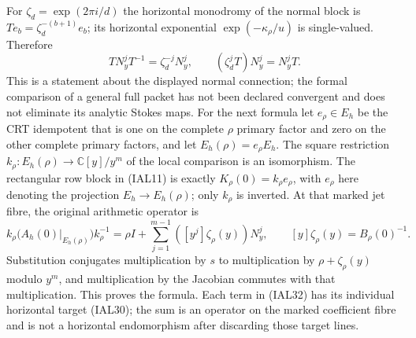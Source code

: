 \documentclass[11pt,a4paper]{article}
\theoremstyle{definition}
\begin{document}
For $\zeta_d=\exp(2\pi i/d)$ the horizontal monodromy of the normal
block is $T e_b=\zeta_d^{-(b+1)}e_b$; its horizontal exponential
$\exp(-\kappa_\rho/u)$ is single-valued.  Therefore
\begin{equation}
 TN_y^jT^{-1}=\zeta_d^{-j}N_y^j,\qquad
 (\zeta_d^jT)N_y^j=N_y^jT.                           \tag{IAL31}
\end{equation}
This is a statement about the displayed normal connection; the
formal comparison of a general full packet has not been declared
convergent and does not eliminate its analytic Stokes maps.
For the next formula let $e_\rho\in E_h$ be the CRT idempotent that
is one on the complete $\rho$ primary factor and zero on the other
complete primary factors, and let $E_h(\rho)=e_\rho E_h$.  The square
restriction $k_\rho:E_h(\rho)\to\mathbb C[y]/y^m$ of the local
comparison is an isomorphism.  The rectangular row block in (IAL11)
is exactly $K_\rho(0)=k_\rho e_\rho$, with $e_\rho$ here denoting
the projection $E_h\to E_h(\rho)$; only $k_\rho$ is inverted.
At that marked jet fibre, the original arithmetic operator is
\begin{equation}
 k_\rho\bigl(A_h(0)|_{E_h(\rho)}\bigr)k_\rho^{-1}
   =\rho I+\sum_{j=1}^{m-1}([y^j]\zeta_\rho(y))N_y^j,
 \qquad [y]\zeta_\rho(y)=B_\rho(0)^{-1}.             \tag{IAL32}
\end{equation}
Substitution conjugates multiplication by $s$ to multiplication by
$\rho+\zeta_\rho(y)$ modulo $y^m$, and multiplication by the Jacobian
commutes with that multiplication.  This proves the formula.  Each
term in (IAL32) has its individual horizontal target (IAL30); the
sum is an operator on the marked coefficient fibre and is not a
horizontal endomorphism after discarding those target lines.
\end{document}
